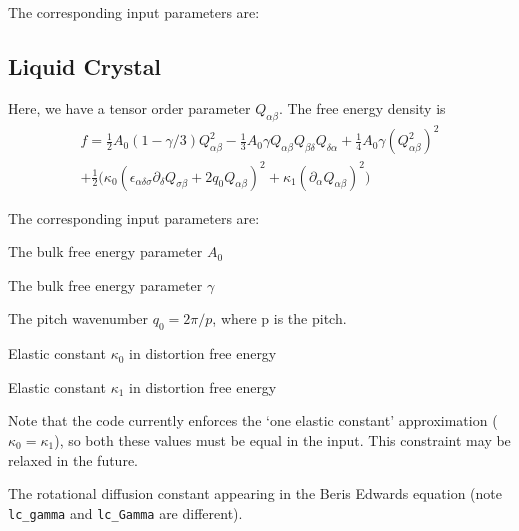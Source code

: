 The corresponding input parameters are:










\subsection{Liquid Crystal}


Here, we have a tensor order parameter $Q_{\alpha\beta}$.
The free energy density is
\begin{eqnarray}
f = {\textstyle\frac{1}{2}}A_0(1 - \gamma/3)Q^2_{\alpha\beta}
  - {\textstyle\frac{1}{3}}A_0 \gamma
Q_{\alpha\beta}Q_{\beta\delta}Q_{\delta\alpha}
 + {\textstyle\frac{1}{4}}A_0 \gamma (Q^2_{\alpha\beta})^2
\nonumber
\\
+ {\textstyle\frac{1}{2}} \Big(
\kappa_0 (\epsilon_{\alpha\delta\sigma} \partial_\delta Q_{\sigma\beta} +
2q_0 Q_{\alpha\beta})^2 + \kappa_1(\partial_\alpha Q_{\alpha\beta})^2 \Big)
\end{eqnarray}

The corresponding input parameters are:

 The bulk free energy parameter $A_0$

 The bulk free energy parameter $\gamma$

 The pitch wavenumber $q_0 = 2\pi / p$, where p
is the pitch.

 Elastic constant $\kappa_0$ in distortion free energy

 Elastic constant $\kappa_1$ in distortion free energy

Note that the code currently enforces the `one elastic constant'
approximation ($\kappa_0 = \kappa_1$), so both these values must
be equal in the input. This constraint may be relaxed in the future.


 The rotational diffusion constant appearing in
the Beris Edwards equation (note \texttt{lc\_gamma} and \texttt{lc\_Gamma}
are different).

